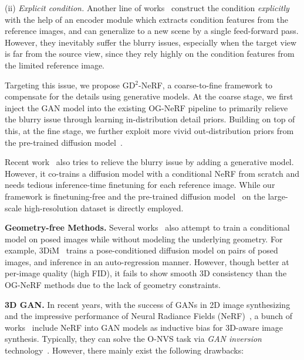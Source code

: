 (ii) \textit{Explicit condition.} Another line of works~\cite{PixelNeRF_yu2021pixelnerf,FE_NVS_guo2022fast,lin2023visionnerf} construct the condition \textit{explicitly} with the help of an encoder module which extracts condition features from the reference images, and can generalize to a new scene by a single feed-forward pass. However, they inevitably suffer the blurry issues, especially when the target view is far from the source view, since they rely highly on the condition features from the limited reference image. 

Targeting this issue, we propose GD$^2$-NeRF, a coarse-to-fine framework to compensate for the details using generative models. At the coarse stage, we first inject the GAN model into the existing OG-NeRF pipeline to primarily relieve the blurry issue through learning in-distribution detail priors. Building on top of this, at the fine stage, we further exploit more vivid out-distribution priors from  the pre-trained diffusion model~\cite{rombach2022LatentDiff,zhang2023addingControlNet}.


Recent work~\cite{gu2023nerfdiff} also tries to relieve the blurry issue by adding a generative model. However, it co-trains a diffusion model with a conditional NeRF from scratch and needs tedious inference-time finetuning for each reference image. While our framework is finetuning-free and the pre-trained diffusion model~\cite{rombach2022LatentDiff,zhang2023addingControlNet} on the large-scale high-resolution dataset is directly employed.


\vspace{0.1cm}
\noindent\textbf{Geometry-free Methods.} Several works~\cite{srt22,watson20223DiM} also attempt to train a conditional model on posed images while without modeling the underlying geometry. For example, 3DiM~\cite{watson20223DiM} trains a pose-conditioned diffusion model on pairs of posed images, and inference in an auto-regression manner. However,  though better at per-image quality (high FID), it fails to show smooth 3D consistency than the OG-NeRF methods due to the lack of geometry constraints.



\vspace{0.1cm}
\noindent\textbf{3D GAN.} 
In recent years, with the success of GANs in 2D image synthesizing~\cite{GAN_resolution_brock2018large,GAN_resolution_choi2018stargan,GAN_resolution_karras2019style} and the impressive performance of Neural Radiance Fields (NeRF)~\cite{NeRF_mildenhall2020nerf}, a bunch of works~\cite{GRAF_schwarz2020graf,PiGAN_chan2021pi,GIRAFFE_niemeyer2021giraffe,chan2022EG3D} include NeRF into GAN models as inductive bias for 3D-aware image synthesis. Typically, they can solve the O-NVS task via \textit{GAN inversion} technology~\cite{chan2022EG3D}. However, there mainly exist the following drawbacks: 

